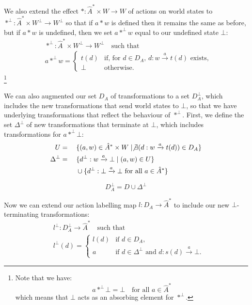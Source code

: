We also extend the effect $\ast : \hat{A}^{\ast} \times W \to W$ of actions on world states to $\ast^{\bot} : \hat{A}^{\ast} \times W^{\bot} \to  W^{\bot}$ so that if $a \ast w$ is defined then it remains the same as before, but if $a \ast w$ is undefined, then we set $a \ast^{\bot} w$ equal to our undefined state $\bot$:
\begin{align}
	 & \ast^{\bot} : \hat{A}^{\ast} \times W^{\bot} \to  W^{\bot} \quad\text{such that} \\
	 & a \ast^{\bot} w =
	\begin{cases}
		t(d) & \text{if, for $d \in D_{A}$, } d : w \xrightarrow{a} t(d) \text{ exists}, \\
		\bot & \text{otherwise.}
	\end{cases}
\end{align}
\footnote{
	Note that we have:
	\begin{equation}
		a \ast^{\bot} \bot = \bot \quad \text{for all $a \in \hat{A}^{\ast}$}
	\end{equation}
	which means that $\bot$ acts as an absorbing element for $\ast^{\bot}$.
}

We can also augmented our set $D_{A}$ of transformations to a set $D_{A}^{\bot}$, which includes the new transformations that send world states to $\bot$, so that we have underlying transformations that reflect the behaviour of $\ast^{\bot}$.
First, we define the set $\Delta^{\bot}$ of new transformations that terminate at $\bot$, which includes transformations for $a \ast^{\bot} \bot$:
\begin{alignat}{2}
	U             & {}={} &  & \{ (a,w) \in \hat{A}^{\ast} \times W \mid \not\exists (d: w \xrightarrow{a} t(d)) \in D_{A} \} \\
	\Delta^{\bot} & {}={} &  & \{ d^{\bot}: w \xrightarrow{a} \bot \mid (a, w) \in U \}                                       \\
	              &       &  & \cup \{ d^{\bot}: \bot \xrightarrow{a} \bot \text{ for all $a \in \hat{A}^{\ast}$} \}
\end{alignat}

\begin{equation}
	D_{A}^{\bot} = D \cup \Delta^{\bot}
\end{equation}

Now we can extend our action labelling map $l: D_{A} \to \hat{A}^{\ast}$ to include our new $\bot$-terminating transformations:
\begin{align}
	 & l^{\bot} : D_{A}^{\bot} \to \hat{A}^{\ast} \quad\text{such that} \\
	 & l^{\bot}(d) =
	\begin{cases}
		l(d) & \text{if $d \in D_{A}$},                                            \\
		a    & \text{if $d \in \Delta^{\bot}$ and $d: s(d) \xrightarrow{a} \bot$.}
	\end{cases}
\end{align}

